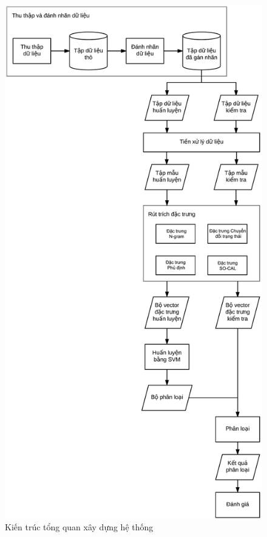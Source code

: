 \begin{figure}[H]
\centering
\includegraphics[scale=0.3]{../hinh/Tongquan.png}
\caption{Kiến trúc tổng quan xây dựng hệ thống} \label{fig:tong-quan-xay-dung-he-thong}
\end{figure}

